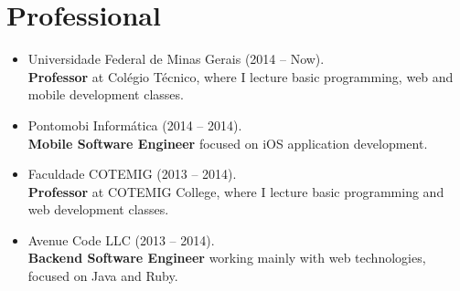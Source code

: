 \section*{Professional}
\begin{itemize}
  \item Universidade Federal de Minas Gerais (2014 -- Now). \\
  \textbf{Professor} at Colégio Técnico, where I lecture basic programming, web and mobile development classes. 
  \item Pontomobi Informática (2014 -- 2014). \\
  \textbf{Mobile Software Engineer} focused on iOS application development.
  \item Faculdade COTEMIG (2013 -- 2014). \\
  \textbf{Professor} at COTEMIG College, where I lecture basic programming and web development classes.
  \item Avenue Code LLC (2013 -- 2014). \\
  \textbf{Backend Software Engineer} working mainly with web technologies, focused on Java and Ruby. 
\end{itemize}